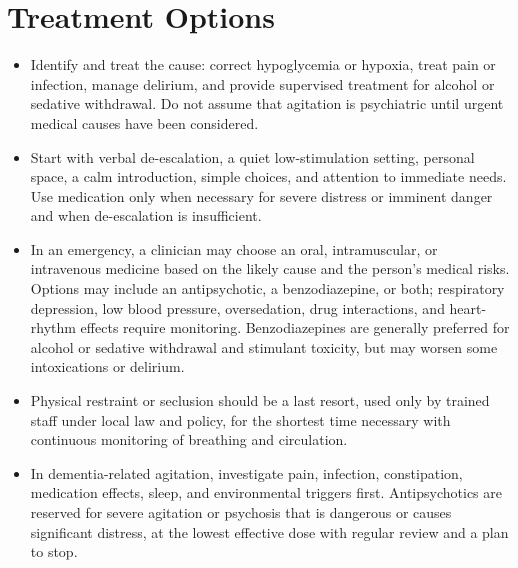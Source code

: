\section*{Treatment Options}
\begin{itemize}
 \item Identify and treat the cause: correct hypoglycemia or hypoxia, treat pain or infection, manage delirium, and provide supervised treatment for alcohol or sedative withdrawal. Do not assume that agitation is psychiatric until urgent medical causes have been considered.
 \item Start with verbal de-escalation, a quiet low-stimulation setting, personal space, a calm introduction, simple choices, and attention to immediate needs. Use medication only when necessary for severe distress or imminent danger and when de-escalation is insufficient.
 \item In an emergency, a clinician may choose an oral, intramuscular, or intravenous medicine based on the likely cause and the person's medical risks. Options may include an antipsychotic, a benzodiazepine, or both; respiratory depression, low blood pressure, oversedation, drug interactions, and heart-rhythm effects require monitoring. Benzodiazepines are generally preferred for alcohol or sedative withdrawal and stimulant toxicity, but may worsen some intoxications or delirium.
 \item Physical restraint or seclusion should be a last resort, used only by trained staff under local law and policy, for the shortest time necessary with continuous monitoring of breathing and circulation.
 \item In dementia-related agitation, investigate pain, infection, constipation, medication effects, sleep, and environmental triggers first. Antipsychotics are reserved for severe agitation or psychosis that is dangerous or causes significant distress, at the lowest effective dose with regular review and a plan to stop.
\end{itemize}

